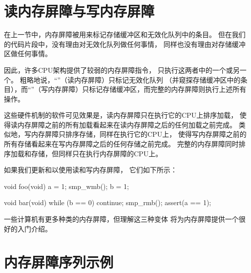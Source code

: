 \section{读内存屏障与写内存屏障}
\label{sec:app:whymb:Read and Write Memory Barriers}

在上一节中，内存屏障被用来标记存储缓冲区和无效化队列中的条目。
但在我们的代码片段中，没有理由对无效化队列做任何事情，
同样也没有理由对存储缓冲区做任何事情。

因此，许多CPU架构提供了较弱的内存屏障指令，
只执行这两者中的一个或另一个。
粗略地说，``''（读内存屏障）只标记无效化队列
（并窥探存储缓冲区中的条目），而``''（写内存屏障）只标记存储缓冲区，而完整的内存屏障则执行上述所有操作。

这些硬件机制的软件可见效果是，读内存屏障只在执行它的CPU上排序加载，
使得读内存屏障之前的所有加载看起来在读内存屏障之后的任何加载之前完成。
类似地，写内存屏障只排序存储，同样在执行它的CPU上，
使得写内存屏障之前的所有存储看起来在写内存屏障之后的任何存储之前完成。
完整的内存屏障同时排序加载和存储，但同样只在执行内存屏障的CPU上。

\QuickQuizEnd

如果我们更新和以使用读和写内存屏障，
它们如下所示：

\begin{VerbatimN}[fontsize=\footnotesize,samepage=true]
void foo(void)
{
	a = 1;
	smp_wmb();
	b = 1;
}

void bar(void)
{
	while (b == 0) continue;
	smp_rmb();
	assert(a == 1);
}
\end{VerbatimN}

一些计算机有更多种类的内存屏障，但理解这三种变体
将为内存屏障提供一个很好的入门介绍。

\section{内存屏障序列示例}
\label{sec:app:whymb:Example Memory-Barrier Sequences}

